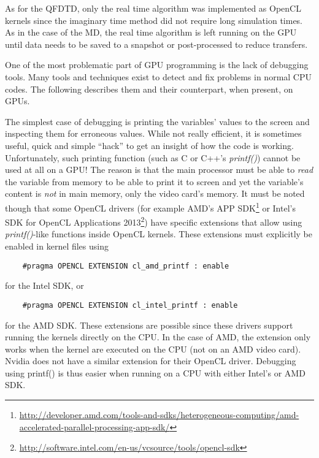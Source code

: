 As for the QFDTD, only the real time algorithm was implemented as OpenCL
kernels since the imaginary time method did not require long simulation times.
As in the case of the MD, the real time algorithm is left running on the GPU
until data needs to be saved to a snapshot or post-processed to reduce
transfers.




One of the most problematic part of GPU programming is the lack of debugging
tools. Many tools and techniques exist to detect and fix problems in
normal CPU codes. The following describes them and their counterpart, when present,
on GPUs.



The simplest case of debugging is printing the variables' values to the screen
and inspecting them for
erroneous values. While not really efficient, it is sometimes useful, quick
and simple ``hack'' to get an insight of how the code is working. Unfortunately,
such printing function (such as C or C++'s \textit{printf()}) cannot be used at
all on a GPU! The reason is that the main processor must be able to
\textit{read} the variable from memory to be able to print it to screen and yet
the variable's content is \textit{not} in main memory, only the video card's
memory. It must be noted though that some OpenCL drivers (for example AMD's
APP SDK\footnote{\url{http://developer.amd.com/tools-and-sdks/heterogeneous-computing/amd-accelerated-parallel-processing-app-sdk/}}
or Intel's SDK for OpenCL Applications
2013\footnote{\url{http://software.intel.com/en-us/vcsource/tools/opencl-sdk}})
have specific extensions that allow using \textit{printf()}-like functions
inside OpenCL kernels. These extensions must explicitly be enabled in kernel
files using
\begin{verbatim}
    #pragma OPENCL EXTENSION cl_amd_printf : enable
\end{verbatim}
for the Intel SDK, or
\begin{verbatim}
    #pragma OPENCL EXTENSION cl_intel_printf : enable
\end{verbatim}
for the AMD SDK. These extensions are possible since these drivers support
running the kernels directly on the CPU. In the case of AMD, the extension only
works when the kernel are executed on the CPU (not on an AMD video card). Nvidia
does not have a similar extension for their OpenCL driver. Debugging using
printf() is thus easier when running on a CPU with either Intel's or AMD SDK.


